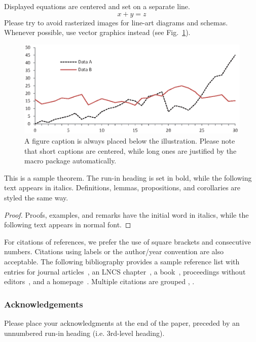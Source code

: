 \documentclass[runningheads]{llncs}
\begin{document}
\noindent Displayed equations are centered and set on a separate
line.
\begin{equation}
x + y = z
\end{equation}
Please try to avoid rasterized images for line-art diagrams and
schemas. Whenever possible, use vector graphics instead (see
Fig.~\ref{fig1}).

\begin{figure}
\includegraphics[width=\textwidth]{fig1.eps}
\caption{A figure caption is always placed below the illustration.
Please note that short captions are centered, while long ones are
justified by the macro package automatically.} \label{fig1}
\end{figure}

\begin{theorem}
This is a sample theorem. The run-in heading is set in bold, while
the following text appears in italics. Definitions, lemmas,
propositions, and corollaries are styled the same way.
\end{theorem}
%
%
\begin{proof}
Proofs, examples, and remarks have the initial word in italics,
while the following text appears in normal font.
\end{proof}
For citations of references, we prefer the use of square brackets
and consecutive numbers. Citations using labels or the author/year
convention are also acceptable. The following bibliography provides
a sample reference list with entries for journal
articles~\cite{ref_article1}, an LNCS chapter~\cite{ref_lncs1}, a
book~\cite{ref_book1}, proceedings without editors~\cite{ref_proc1},
and a homepage~\cite{ref_url1}. Multiple citations are grouped
\cite{ref_article1,ref_lncs1,ref_book1},
\cite{ref_article1,ref_book1,ref_proc1,ref_url1}.

\subsubsection{Acknowledgements} Please place your acknowledgments at
the end of the paper, preceded by an unnumbered run-in heading (i.e.
3rd-level heading).
\end{document}
